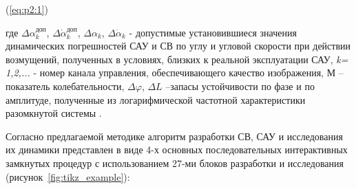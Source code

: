 (\ref{eq:p2:1})

где  $\varDelta \alpha^{\textit{доп}}_{k}$, 
$\varDelta \dot{\alpha}^{\textit{доп}}_{k}$, 
$\varDelta \alpha _k$, 
$\varDelta \dot{\alpha}_k$ 
- допустимые установившиеся значения динамических погрешностей САУ и СВ по углу  и угловой скорости  при действии возмущений, полученных в условиях, близких к реальной эксплуатации САУ, \textit{k= 1,2,...} - номер канала управления, обеспечивающего качество изображения, М – показатель колебательности, $\varDelta \varphi$, $\varDelta L$ –запасы устойчивости по фазе и по амплитуде, полученные из логарифмической частотной характеристики  разомкнутой системы \cite[]{Bessekerski20}.

Согласно предлагаемой методике алгоритм разработки СВ, САУ и исследования их динамики представлен в виде 4-х основных последовательных интерактивных замкнутых процедур с использованием 27-ми блоков разработки и исследования (рисунок~\ref{fig:tikz_example}):


